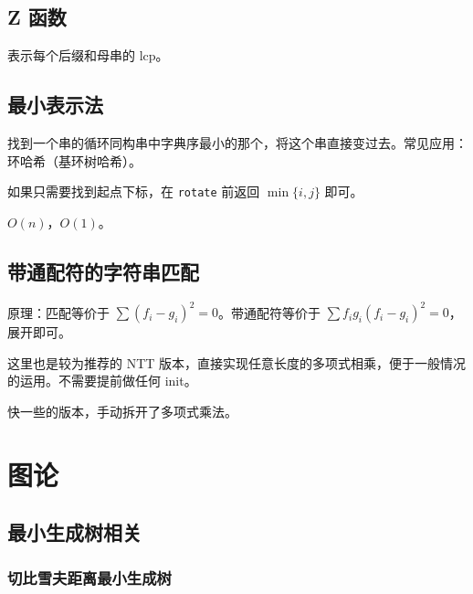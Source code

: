\documentclass[12pt]{ctexart}
\begin{document}




\subsection{Z 函数}

表示每个后缀和母串的 lcp。





\subsection{最小表示法}

找到一个串的循环同构串中字典序最小的那个，将这个串直接变过去。常见应用：环哈希（基环树哈希）。

如果只需要找到起点下标，在 \verb|rotate| 前返回 $\min\{i,j\}$ 即可。

$O(n)$，$O(1)$。


\subsection{带通配符的字符串匹配}

原理：匹配等价于 $\sum (f_i-g_i)^2=0$。带通配符等价于 $\sum f_ig_i(f_i-g_i)^2=0$，展开即可。

这里也是较为推荐的 NTT 版本，直接实现任意长度的多项式相乘，便于一般情况的运用。不需要提前做任何 init。



快一些的版本，手动拆开了多项式乘法。


\newpage

\section{图论}

\subsection{最小生成树相关}

\subsubsection{切比雪夫距离最小生成树}
\end{document}
